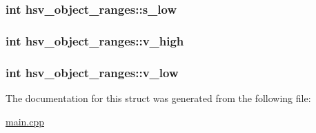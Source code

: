 \subsubsection[{\texorpdfstring{s\+\_\+low}{s_low}}]{\setlength{\rightskip}{0pt plus 5cm}int hsv\+\_\+object\+\_\+ranges\+::s\+\_\+low}\hypertarget{structhsv__object__ranges_a88708aeb732887c5b8e2b5c0809de85c}{}\label{structhsv__object__ranges_a88708aeb732887c5b8e2b5c0809de85c}
\subsubsection[{\texorpdfstring{v\+\_\+high}{v_high}}]{\setlength{\rightskip}{0pt plus 5cm}int hsv\+\_\+object\+\_\+ranges\+::v\+\_\+high}\hypertarget{structhsv__object__ranges_a00ca3df99b0bdeac1cb7157fc0e3fbf7}{}\label{structhsv__object__ranges_a00ca3df99b0bdeac1cb7157fc0e3fbf7}
\subsubsection[{\texorpdfstring{v\+\_\+low}{v_low}}]{\setlength{\rightskip}{0pt plus 5cm}int hsv\+\_\+object\+\_\+ranges\+::v\+\_\+low}\hypertarget{structhsv__object__ranges_a2e1235a8053f3bd1ae5b1b183bd7ab8f}{}\label{structhsv__object__ranges_a2e1235a8053f3bd1ae5b1b183bd7ab8f}


The documentation for this struct was generated from the following file\+:\begin{DoxyCompactItemize}
\item 
\hyperlink{main_8cpp}{main.\+cpp}\end{DoxyCompactItemize}
